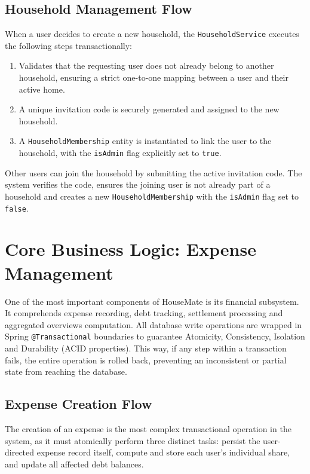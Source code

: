 \subsection{Household Management Flow}
When a user decides to create a new household, the \texttt{HouseholdService} executes the following steps transactionally:
\begin{enumerate}
    \item Validates that the requesting user does not already belong to another household, ensuring a strict one-to-one mapping between a user and their active home.
    \item A unique invitation code is securely generated and assigned to the new household.
    \item A \texttt{HouseholdMembership} entity is instantiated to link the user to the household, with the \texttt{isAdmin} flag explicitly set to \texttt{true}.
\end{enumerate}

Other users can join the household by submitting the active invitation code. The system verifies the code, ensures the joining user is not already part of a household and creates a new \texttt{HouseholdMembership} with the \texttt{isAdmin} flag set to \texttt{false}.

\section{Core Business Logic: Expense Management}
\label{sec:core-expense_management}
One of the most important components of HouseMate is its financial subsystem. It comprehends expense recording, debt tracking, settlement processing and aggregated overviews computation. All database write operations are wrapped in Spring \texttt{@Transactional} boundaries to guarantee Atomicity, Consistency, Isolation and Durability (ACID properties). This way, if any step within a transaction fails, the entire operation is rolled back, preventing an inconsistent or partial state from reaching the database.

\subsection{Expense Creation Flow}
The creation of an expense is the most complex transactional operation in the system, as it must atomically perform three distinct tasks: persist the user-directed expense record itself, compute and store each user's individual share, and update all affected debt balances.

